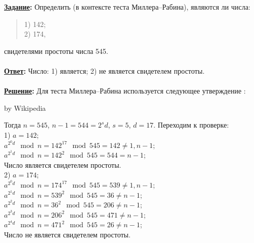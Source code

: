 \documentclass{article}
\begin{document}
\textbf{\uline{Задание}:} Определить (в контексте теста Миллера--Рабина), являются ли числа:
\begin{flushleft}
\begin{verse}
1) 142;\\
2) 174,\end{verse}
\end{flushleft}
свидетелями простоты числа 545.\\
\\
\textbf{\uline{Ответ}:} Число: 1) является; 2) не является свидетелем простоты.\\
\\
\textbf{ \uline{Решение}: } Для теста Миллера--Рабина используется следующее утверждение : \\
\noindent{}
\begin{flushright}\footnotesize by Wikipedia \end{flushright}
Тогда $n=545$, $n-1=544=2^{s}d$, $s=5$, $d=17$. Переходим к проверке:\\
1) $a=142$;\\
$a^{2^{0}d}\mod n=142^{17}\mod 545=142\not=1, n-1$;\\
$a^{2^{1}d}\mod n=142^{2}\mod 545=544=n-1$;\\
Число является свидетелем простоты.\\
2) $a=174$;\\
$a^{2^{0}d}\mod n=174^{17}\mod 545=539\not=1, n-1$;\\
$a^{2^{1}d}\mod n=539^{2}\mod 545=36\not=n-1$;\\
$a^{2^{2}d}\mod n=36^{2}\mod 545=206\not=n-1$;\\
$a^{2^{3}d}\mod n=206^{2}\mod 545=471\not=n-1$;\\
$a^{2^{4}d}\mod n=471^{2}\mod 545=26\not=n-1$;\\
Число не является свидетелем простоты.\\
\end{document}

